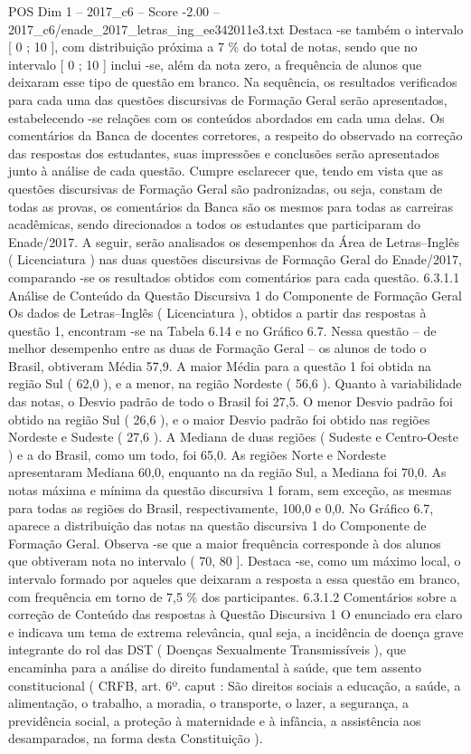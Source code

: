 \begin{textsample}{POS Dim 1 – 2017\_c6 – Score -2.00 – 2017\_c6/enade\_2017\_letras\_ing\_ee342011e3.txt}
Destaca -se também o intervalo [ 0 ; 10 ], com distribuição próxima a 7 \% do total de notas, sendo que no intervalo [ 0 ; 10 ] inclui -se, além da nota zero, a frequência de alunos que deixaram esse tipo de questão em branco.
Na sequência, os resultados verificados para cada uma das questões discursivas de Formação Geral serão apresentados, estabelecendo -se relações com os conteúdos abordados em cada uma delas.
Os comentários da Banca de docentes corretores, a respeito do observado na correção das respostas dos estudantes, suas impressões e conclusões serão apresentados junto à análise de cada questão.
Cumpre esclarecer que, tendo em vista que as questões discursivas de Formação Geral são padronizadas, ou seja, constam de todas as provas, os comentários da Banca são os mesmos para todas as carreiras acadêmicas, sendo direcionados a todos os estudantes que participaram do Enade/2017.
A seguir, serão analisados os desempenhos da Área de Letras–Inglês ( Licenciatura ) nas duas questões discursivas de Formação Geral do Enade/2017, comparando -se os resultados obtidos com comentários para cada questão. 6.3.1.1 Análise de Conteúdo da Questão Discursiva 1 do Componente de Formação Geral Os dados de Letras–Inglês ( Licenciatura ), obtidos a partir das respostas à questão 1, encontram -se na Tabela 6.14 e no Gráfico 6.7.
Nessa questão – de melhor desempenho entre as duas de Formação Geral – os alunos de todo o Brasil, obtiveram Média 57,9.
A maior Média para a questão 1 foi obtida na região Sul ( 62,0 ), e a menor, na região Nordeste ( 56,6 ).
Quanto à variabilidade das notas, o Desvio padrão de todo o Brasil foi 27,5.
O menor Desvio padrão foi obtido na região Sul ( 26,6 ), e o maior Desvio padrão foi obtido nas regiões Nordeste e Sudeste ( 27,6 ).
A Mediana de duas regiões ( Sudeste e Centro-Oeste ) e a do Brasil, como um todo, foi 65,0.
As regiões Norte e Nordeste apresentaram Mediana 60,0, enquanto na da região Sul, a Mediana foi 70,0.
As notas máxima e mínima da questão discursiva 1 foram, sem exceção, as mesmas para todas as regiões do Brasil, respectivamente, 100,0 e 0,0.
No Gráfico 6.7, aparece a distribuição das notas na questão discursiva 1 do Componente de Formação Geral.
Observa -se que a maior frequência corresponde à dos alunos que obtiveram nota no intervalo ( 70, 80 ].
Destaca -se, como um máximo local, o intervalo formado por aqueles que deixaram a resposta a essa questão em branco, com frequência em torno de 7,5 \% dos participantes. 6.3.1.2 Comentários sobre a correção de Conteúdo das respostas à Questão Discursiva 1 O enunciado era claro e indicava um tema de extrema relevância, qual seja, a incidência de doença grave integrante do rol das DST ( Doenças Sexualmente Transmissíveis ), que encaminha para a análise do direito fundamental à saúde, que tem assento constitucional ( CRFB, art. 6º. caput : São direitos sociais a educação, a saúde, a alimentação, o trabalho, a moradia, o transporte, o lazer, a segurança, a previdência social, a proteção à maternidade e à infância, a assistência aos desamparados, na forma desta Constituição ).

\end{textsample}
